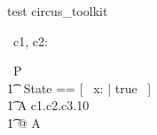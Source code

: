 \begin{zsection}
   \SECTION test \parents circus\_toolkit
\end{zsection}

\begin{circus}
   \circchannel\ c1, c2: \boolean
\end{circus}

\begin{circus}
    \circprocess\ P \circdef \circbegin \\
    	\t1 \circstate\ State == [~ x: \nat | true ~] \\
        \t1 A \circdef c1.\true \then c2.\false \then c3.10 \then \Skip \\
        \t1 @ A \\
    \circend
\end{circus}

